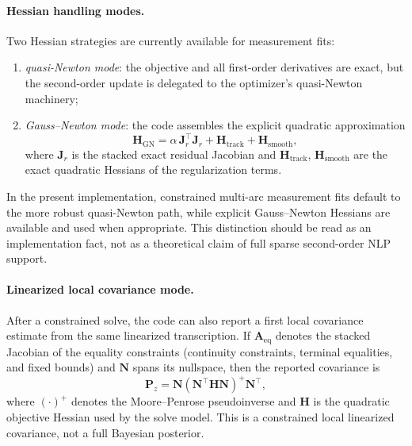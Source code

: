 \documentclass[11pt]{article}
\begin{document}
\paragraph{Hessian handling modes.}
Two Hessian strategies are currently available for measurement fits:
\begin{enumerate}
    \item \emph{quasi-Newton mode}: the objective and all first-order
    derivatives are exact, but the second-order update is delegated to the
    optimizer's quasi-Newton machinery;
    \item \emph{Gauss--Newton mode}: the code assembles the explicit quadratic
    approximation
    \begin{equation}
        \bm{H}_{\mathrm{GN}}
        =
        \alpha\,\bm{J}_r^\top \bm{J}_r
        +
        \bm{H}_{\mathrm{track}}
        +
        \bm{H}_{\mathrm{smooth}},
    \end{equation}
    where $\bm{J}_r$ is the stacked exact residual Jacobian and
    $\bm{H}_{\mathrm{track}}$, $\bm{H}_{\mathrm{smooth}}$ are the exact
    quadratic Hessians of the regularization terms.
\end{enumerate}
In the present implementation, constrained multi-arc measurement fits default
to the more robust quasi-Newton path, while explicit Gauss--Newton Hessians are
available and used when appropriate. This distinction should be read as an
implementation fact, not as a theoretical claim of full sparse second-order NLP
support.

\paragraph{Linearized local covariance mode.}
After a constrained solve, the code can also report a first local covariance
estimate from the same linearized transcription. If
$\bm{A}_{\mathrm{eq}}$ denotes the stacked Jacobian of the equality constraints
(continuity constraints, terminal equalities, and fixed bounds) and
$\bm{N}$ spans its nullspace, then the reported covariance is
\begin{equation}
    \bm{P}_z
    =
    \bm{N}
    \left(
        \bm{N}^\top \bm{H} \bm{N}
    \right)^{+}
    \bm{N}^\top,
\end{equation}
where $(\cdot)^{+}$ denotes the Moore--Penrose pseudoinverse and $\bm{H}$ is
the quadratic objective Hessian used by the solve model. This is a constrained
local linearized covariance, not a full Bayesian posterior.
\end{document}
